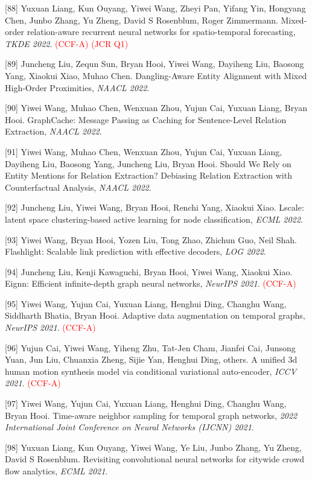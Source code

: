 [88] Yuxuan Liang, Kun Ouyang, Yiwei Wang, Zheyi Pan, Yifang Yin, Hongyang Chen, Junbo Zhang, Yu Zheng, David S Rosenblum, Roger Zimmermann. Mixed-order relation-aware recurrent neural networks for spatio-temporal forecasting, \textit{TKDE 2022}. \textcolor{red}{(CCF-A)} \textcolor{red}{(JCR Q1)}

[89] Juncheng Liu, Zequn Sun, Bryan Hooi, Yiwei Wang, Dayiheng Liu, Baosong Yang, Xiaokui Xiao, Muhao Chen. Dangling-Aware Entity Alignment with Mixed High-Order Proximities, \textit{NAACL 2022}.

[90] Yiwei Wang, Muhao Chen, Wenxuan Zhou, Yujun Cai, Yuxuan Liang, Bryan Hooi. GraphCache: Message Passing as Caching for Sentence-Level Relation Extraction, \textit{NAACL 2022}.

[91] Yiwei Wang, Muhao Chen, Wenxuan Zhou, Yujun Cai, Yuxuan Liang, Dayiheng Liu, Baosong Yang, Juncheng Liu, Bryan Hooi. Should We Rely on Entity Mentions for Relation Extraction? Debiasing Relation Extraction with Counterfactual Analysis, \textit{NAACL 2022}.

[92] Juncheng Liu, Yiwei Wang, Bryan Hooi, Renchi Yang, Xiaokui Xiao. Lscale: latent space clustering-based active learning for node classification, \textit{ECML 2022}.

[93] Yiwei Wang, Bryan Hooi, Yozen Liu, Tong Zhao, Zhichun Guo, Neil Shah. Flashlight: Scalable link prediction with effective decoders, \textit{LOG 2022}.

[94] Juncheng Liu, Kenji Kawaguchi, Bryan Hooi, Yiwei Wang, Xiaokui Xiao. Eignn: Efficient infinite-depth graph neural networks, \textit{NeurIPS 2021}. \textcolor{red}{(CCF-A)}

[95] Yiwei Wang, Yujun Cai, Yuxuan Liang, Henghui Ding, Changhu Wang, Siddharth Bhatia, Bryan Hooi. Adaptive data augmentation on temporal graphs, \textit{NeurIPS 2021}. \textcolor{red}{(CCF-A)}

[96] Yujun Cai, Yiwei Wang, Yiheng Zhu, Tat-Jen Cham, Jianfei Cai, Junsong Yuan, Jun Liu, Chuanxia Zheng, Sijie Yan, Henghui Ding, others. A unified 3d human motion synthesis model via conditional variational auto-encoder, \textit{ICCV 2021}. \textcolor{red}{(CCF-A)}

[97] Yiwei Wang, Yujun Cai, Yuxuan Liang, Henghui Ding, Changhu Wang, Bryan Hooi. Time-aware neighbor sampling for temporal graph networks, \textit{2022 International Joint Conference on Neural Networks (IJCNN) 2021}.

[98] Yuxuan Liang, Kun Ouyang, Yiwei Wang, Ye Liu, Junbo Zhang, Yu Zheng, David S Rosenblum. Revisiting convolutional neural networks for citywide crowd flow analytics, \textit{ECML 2021}.

